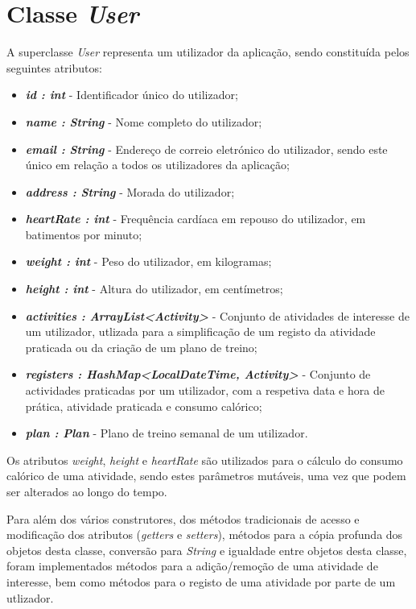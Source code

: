 \documentclass[a4paper,12pt]{scrreprt}
\begin{document}
\clearpage
\section{Classe \textit{User}}
    A superclasse \textit{User} representa um utilizador da aplicação, sendo constituída pelos seguintes atributos:

    \begin{itemize}
        \item \textit{\textbf{id : int}} - Identificador único do utilizador;
        \item \textit{\textbf{name : String}} - Nome completo do utilizador;
        \item \textit{\textbf{email : String}} - Endereço de correio eletrónico do utilizador, sendo este único em relação a todos os utilizadores da aplicação;
        \item \textit{\textbf{address : String}} - Morada do utilizador;
        \item \textit{\textbf{heartRate : int}} - Frequência cardíaca em repouso do utilizador, em batimentos por minuto;
        \item \textit{\textbf{weight : int}} - Peso do utilizador, em kilogramas;
        \item \textit{\textbf{height : int}} - Altura do utilizador, em centímetros;
        \item \textit{\textbf{activities : ArrayList<Activity>}} - Conjunto de atividades de interesse de um utilizador, utlizada para a simplificação de um registo da atividade praticada ou da criação de um plano de treino;
        \item \textit{\textbf{registers : HashMap<LocalDateTime, Activity>}} - Conjunto de actividades praticadas por um utilizador, com a respetiva data e hora de prática, atividade praticada e consumo calórico;
        \item \textit{\textbf{plan : Plan}} - Plano de treino semanal de um utilizador.
    \end{itemize}

    Os atributos \textit{weight}, \textit{height} e \textit{heartRate} são utilizados para o cálculo do consumo calórico de uma atividade,
    sendo estes parâmetros mutáveis, uma vez que podem ser alterados ao longo do tempo.

    Para além dos vários construtores, dos métodos tradicionais de acesso e modificação dos atributos (\textit{getters} e \textit{setters}), métodos para a cópia profunda dos objetos desta classe, conversão para \textit{String} e igualdade entre objetos desta classe, foram implementados métodos para a adição/remoção de uma atividade de interesse, bem como métodos para o registo de uma atividade por parte de um utlizador.
\end{document}
